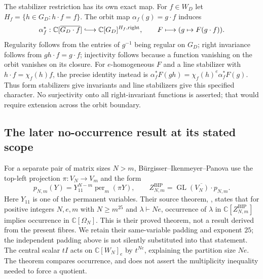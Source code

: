 The stabilizer restriction has its own exact map. For $f\in W_D$ let
$H_f=\{h\in G_D:h\cdot f=f\}$. The orbit map
$\alpha_f(g)=g\cdot f$ induces
\[
 \alpha_f^*:\mathbb C[\overline{G_D\cdot f}]
 \lhook\joinrel\longrightarrow \mathbb C[G_D]^{H_f,\mathrm{right}},
 \qquad F\longmapsto(g\mapsto F(g\cdot f)).
\]
Regularity follows from the entries of $g^{-1}$ being regular on $G_D$;
right invariance follows from $gh\cdot f=g\cdot f$; injectivity follows
because a function vanishing on the orbit vanishes on its closure.
For $e$-homogeneous $F$ and a line stabilizer with
$h\cdot f=\chi_f(h)f$, the precise identity instead is
$\alpha_f^*F(gh)=\chi_f(h)^e\alpha_f^*F(g)$.
Thus form stabilizers give invariants and line stabilizers give this
specified character. No surjectivity onto all right-invariant functions
is asserted; that would require extension across the orbit boundary.

\subsection{The later no-occurrence result at its stated scope}

For a separate pair of matrix sizes $N>m$, B\"urgisser--Ikenmeyer--Panova
use the top-left projection $\pi:V_N\to V_m$ and the form
\[
 p_{N,m}(Y)=Y_{11}^{N-m}\operatorname{per}_m(\pi Y),\qquad
 Z^{\mathrm{BIP}}_{N,m}=\overline{\operatorname{GL}(V_N)\cdot p_{N,m}}.
\]
Here $Y_{11}$ is one of the permanent variables. Their source theorem,
\cite[Theorem 1.4]{BIP2018Interface}, states that for positive integers
$N,e,m$ with $N\ge m^{25}$ and $\lambda\vdash Ne$, occurrence of
$\lambda$ in $\mathbb C[Z^{\mathrm{BIP}}_{N,m}]$ implies occurrence
in $\mathbb C[\Omega_N]$. This is their proved theorem, not a result
derived from the present fibres. We retain their same-variable padding
and exponent $25$; the independent padding above is not silently
substituted into that statement. The central scalar $tI$ acts on
$\mathbb C[W_N]_e$ by $t^{Ne}$, explaining the partition size $Ne$.
The theorem compares occurrence, and does not assert the multiplicity
inequality needed to force a quotient.

